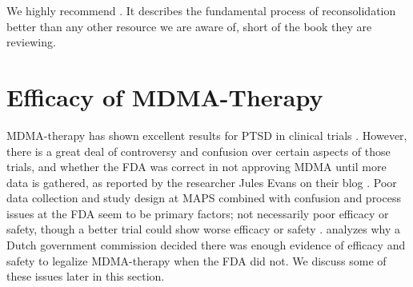 \documentclass[12pt,letterpaper]{book}
\begin{document}
We highly recommend \textcite{lesswrongCoherenceTherapy}. It describes the fundamental process of reconsolidation better than any other resource we are aware of, short of the book they are reviewing.

\section{Efficacy of MDMA-Therapy}
MDMA-therapy has shown excellent results for PTSD in clinical trials \cite{mitchellMDMAClinicalTrial,mitchellMDMAClinicalTrial2}. However, there is a great deal of controversy and confusion over certain aspects of those trials, and whether the FDA was correct in not approving MDMA until more data is gathered, as reported by the researcher Jules Evans on their blog \textcite{evansBlame}. Poor data collection and study design at MAPS combined with confusion and process issues at the FDA seem to be primary factors; not necessarily poor efficacy or safety, though a better trial could show worse efficacy or safety \cite{evansBlame}. \textcite{fdaVSdutch} analyzes why a Dutch government commission decided there was enough evidence of efficacy and safety to legalize MDMA-therapy when the FDA did not. We discuss some of these issues later in this section.
\end{document}
